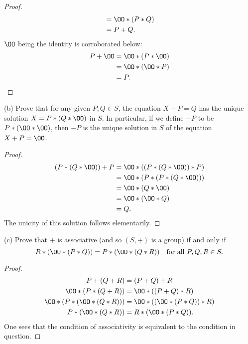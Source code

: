 \documentclass[11pt, oneside]{article}
\begin{document}
\begin{enumerate}
\begin{proof}
\begin{align*}
		&= \OO * (P * Q)\\
		&= P + Q.
\end{align*}
$\OO$ being the identity is corroborated below:
\begin{align*}
P+\OO 	&= \OO * (P * \OO)\\
		&= \OO * (\OO * P)\\
		&= P.
\end{align*}
\end{proof}
(b) Prove that for any given $P,Q\in S$, the equation $X+P=Q$ has the unique solution $X=P*(Q*\OO)$ in $S$. In particular, if we define $-P$ to be $P* (\OO*\OO)$, then $-P$ is the unique solution in $S$ of the equation $X+P=\OO$.
\begin{proof}
\begin{align*}
(P*(Q*\OO)) +  P	&= \OO * ((P*(Q*\OO)) * P)\\
				&= \OO * (P *(P*(Q*\OO)))\\
				&= \OO * (Q *\OO)\\
				&= \OO * (\OO * Q)\\
				&= Q.
\end{align*}
The unicity of this solution follows elementarily. %
\end{proof}
(c) Prove that $+$ is associative (and so $(S,+)$ is a group) if and only if 
$$
R * (\OO * (P *Q)) = P * (\OO *( Q * R))\quad \textrm {for all } P,Q,R\in S.
$$
\begin{proof}
\begin{align*}
P+(Q+R) &= (P+Q) + R\\
\OO * (P * (Q+R)) &= \OO * ((P+Q)* R)\\
\OO * (P*(\OO * (Q*R))) & = \OO * ((\OO * (P*Q))*R)\\
P*(\OO * (Q*R)) &= R * (\OO * (P*Q)).
\end{align*}
One sees that the condition of associativity is equivalent to the condition in question.
\end{proof}
%
%
\end{enumerate}
\end{document}
